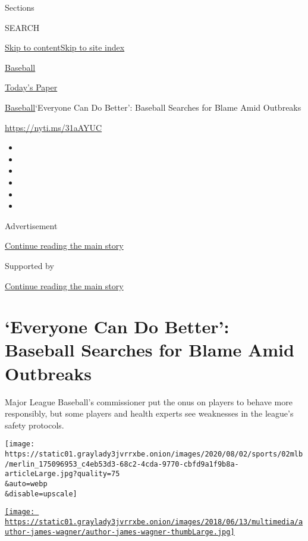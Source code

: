 Sections

SEARCH

\protect\hyperlink{site-content}{Skip to
content}\protect\hyperlink{site-index}{Skip to site index}

\href{https://www.nytimes3xbfgragh.onion/section/sports/baseball}{Baseball}

\href{https://myaccount.nytimes3xbfgragh.onion/auth/login?response_type=cookie\&client_id=vi}{}

\href{https://www.nytimes3xbfgragh.onion/section/todayspaper}{Today's
Paper}

\href{/section/sports/baseball}{Baseball}\textbar{}`Everyone Can Do
Better': Baseball Searches for Blame Amid Outbreaks

\url{https://nyti.ms/31aAYUC}

\begin{itemize}
\item
\item
\item
\item
\item
\item
\end{itemize}

Advertisement

\protect\hyperlink{after-top}{Continue reading the main story}

Supported by

\protect\hyperlink{after-sponsor}{Continue reading the main story}

\hypertarget{everyone-can-do-better-baseball-searches-for-blame-amid-outbreaks}{%
\section{`Everyone Can Do Better': Baseball Searches for Blame Amid
Outbreaks}\label{everyone-can-do-better-baseball-searches-for-blame-amid-outbreaks}}

Major League Baseball's commissioner put the onus on players to behave
more responsibly, but some players and health experts see weaknesses in
the league's safety protocols.

\texttt{[image: https://static01.graylady3jvrrxbe.onion/images/2020/08/02/sports/02mlb/merlin\_175096953\_c4eb53d3-68c2-4cda-9770-cbfd9a1f9b8a-articleLarge.jpg?quality=75\\\&auto=webp\\\&disable=upscale]}

\href{https://www.nytimes3xbfgragh.onion/by/james-wagner}{\texttt{[image: https://static01.graylady3jvrrxbe.onion/images/2018/06/13/multimedia/author-james-wagner/author-james-wagner-thumbLarge.jpg]}}

